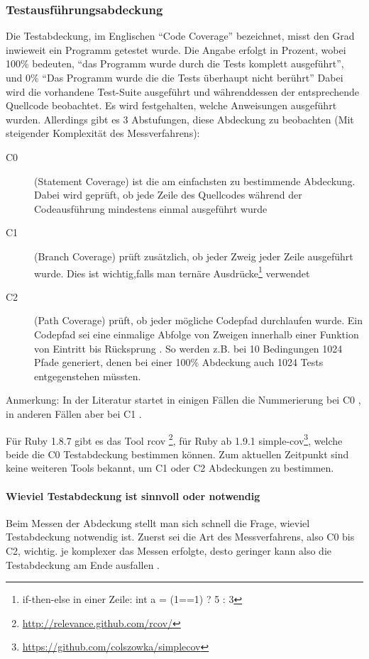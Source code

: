 \subsubsection{Testausführungsabdeckung}
Die Testabdeckung, im Englischen "`Code Coverage"' bezeichnet, misst den Grad inwieweit ein Programm getestet wurde. Die Angabe erfolgt in Prozent, wobei 100\% bedeuten, "`das Programm wurde durch die Tests komplett ausgeführt"', und 0\% "`Das Programm wurde die die Tests überhaupt nicht berührt"' Dabei wird die vorhandene Test-Suite ausgeführt und währenddessen der entsprechende Quellcode beobachtet. Es wird festgehalten, welche Anweisungen ausgeführt wurden. Allerdings gibt es 3 Abstufungen, diese Abdeckung zu beobachten (Mit steigender Komplexität des Messverfahrens):
\begin{description}
 \item[C0] (Statement Coverage) ist die am einfachsten zu bestimmende Abdeckung. Dabei wird geprüft, ob jede Zeile des Quellcodes während der Codeausführung mindestens einmal ausgeführt wurde
 \item[C1] (Branch Coverage) prüft zusätzlich, ob jeder Zweig jeder Zeile ausgeführt wurde. Dies ist wichtig,falls man ternäre Ausdrücke\footnote{if-then-else in einer Zeile: int a = (1==1) ? 5 : 3} verwendet
 \item[C2] (Path Coverage) prüft, ob jeder mögliche Codepfad durchlaufen wurde. Ein Codepfad sei eine einmalige Abfolge von Zweigen innerhalb einer Funktion von Eintritt bis Rücksprung \citep{steve_cornett_code_1996}. So werden z.B. bei 10 Bedingungen 1024 Pfade generiert, denen bei einer 100\% Abdeckung auch 1024 Tests entgegenstehen müssten.
 \end{description}
 Anmerkung: In der Literatur startet in einigen Fällen die Nummerierung bei C0 \citep{catherine_powell_abakas_2008}, in anderen Fällen aber bei C1 \citep{steve_cornett_code_1996}.
 
 Für Ruby 1.8.7 gibt es das Tool rcov \footnote{\url{http://relevance.github.com/rcov/}}, für Ruby ab 1.9.1 simple-cov\footnote{\url{https://github.com/colszowka/simplecov}}, welche beide die C0 Testabdeckung bestimmen können. Zum aktuellen Zeitpunkt sind keine weiteren Tools bekannt, um C1 oder C2 Abdeckungen zu bestimmen.
 \paragraph{Wieviel Testabdeckung ist sinnvoll oder notwendig}
 
 Beim Messen der Abdeckung stellt man sich schnell die Frage, wieviel Testabdeckung notwendig ist. Zuerst sei die Art des Messverfahrens, also C0 bis C2, wichtig. je komplexer das Messen erfolgte, desto geringer kann also die Testabdeckung am Ende ausfallen \citep{catherine_powell_abakas_2008}.
 

